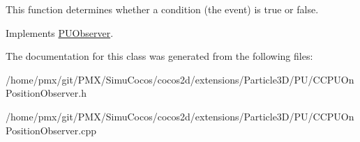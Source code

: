 This function determines whether a condition (the event) is true or false. 

Implements \hyperlink{classPUObserver_a50f59cc3245e291b641463db5d3037f7}{P\+U\+Observer}.



The documentation for this class was generated from the following files\+:\begin{DoxyCompactItemize}
\item 
/home/pmx/git/\+P\+M\+X/\+Simu\+Cocos/cocos2d/extensions/\+Particle3\+D/\+P\+U/C\+C\+P\+U\+On\+Position\+Observer.\+h\item 
/home/pmx/git/\+P\+M\+X/\+Simu\+Cocos/cocos2d/extensions/\+Particle3\+D/\+P\+U/C\+C\+P\+U\+On\+Position\+Observer.\+cpp\end{DoxyCompactItemize}
